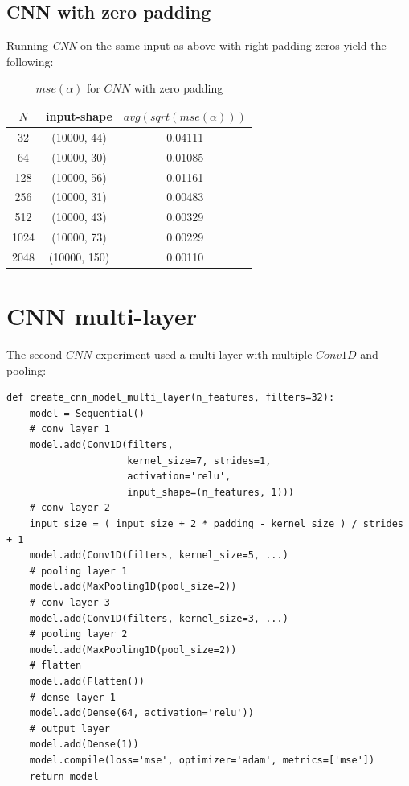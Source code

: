 \documentclass[a4paper, 12pt]{report}
\begin{document}
\subsection{CNN with zero padding}
\par Running \textit{CNN} on the same input as above with right padding zeros yield the following:
\begin{table}[h!]
    \centering
    \begin{tabular}{||c c c||} 
        \hline
        $N$ & input-shape & $avg(sqrt(mse(\alpha)))$ \\ [0.5ex] 
        \hline\hline
        32 & (10000, 44) & 0.04111 \\ 
        \hline
        64 & (10000, 30) & 0.01085 \\
        \hline
        128 & (10000, 56) & 0.01161 \\
        \hline
        256 & (10000, 31) & 0.00483 \\
        \hline
        512 & (10000, 43) & 0.00329 \\ 
        \hline
        1024 & (10000, 73) & 0.00229 \\ 
        \hline
        2048 & (10000, 150) & 0.00110 \\ 
        \hline
    \end{tabular}
    \caption{$mse(\alpha)$ for $CNN$ with zero padding}
    \label{table:cnn-zeros-sqrt-mse}
\end{table}

\section{CNN multi-layer}
The second $CNN$ experiment used a multi-layer with multiple $Conv1D$ and pooling:

\begin{verbatim}
def create_cnn_model_multi_layer(n_features, filters=32):
    model = Sequential()
    # conv layer 1
    model.add(Conv1D(filters,
                     kernel_size=7, strides=1, 
                     activation='relu', 
                     input_shape=(n_features, 1)))
    # conv layer 2
    input_size = ( input_size + 2 * padding - kernel_size ) / strides  + 1
    model.add(Conv1D(filters, kernel_size=5, ...) 
    # pooling layer 1
    model.add(MaxPooling1D(pool_size=2))
    # conv layer 3
    model.add(Conv1D(filters, kernel_size=3, ...) 
    # pooling layer 2
    model.add(MaxPooling1D(pool_size=2))
    # flatten
    model.add(Flatten())
    # dense layer 1
    model.add(Dense(64, activation='relu'))
    # output layer
    model.add(Dense(1))
    model.compile(loss='mse', optimizer='adam', metrics=['mse'])
    return model
\end{verbatim}
\end{document}

